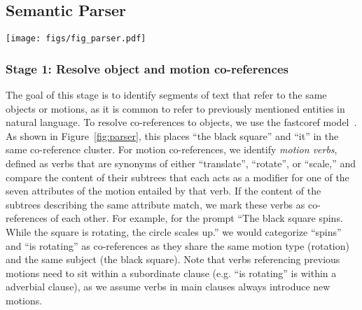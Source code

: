 \subsection{Semantic Parser}
\begin{figure*}[t]
    \centering
    \texttt{[image: figs/fig\_parser.pdf]}
    \caption{
        The processing pipeline of our semantic parser. 
    }
    \label{fig:parser}
\end{figure*}



\subsubsection{Stage 1: Resolve object and motion co-references}
The goal of this stage is to identify segments of text that refer to the same objects or motions, as it is common to refer to previously mentioned entities in natural language.
%
To resolve co-references to objects, we use the fastcoref model~\cite{otmazgin2022fastcoref}.
As shown in Figure~\ref{fig:parser}, this places ``the black square'' and ``it'' in the same co-reference cluster.
%
For motion co-references, we identify \textit{motion verbs}, defined as verbs that are synonyms of either ``translate'', ``rotate'', or ``scale,'' and compare the content of their subtrees that each acts as a modifier for one of the seven attributes of the motion entailed by that verb.
If the content of the subtrees describing the same attribute match, we mark these verbs as co-references of each other.
For example, for the prompt ``The black square spins. While the square is rotating, the circle scales up.'' we would categorize ``spins'' and ``is rotating'' as co-references as they share the same motion type (rotation) and the same subject (the black square).
Note that verbs referencing previous motions need to sit within a subordinate clause (e.g. ``is rotating'' is within a adverbial clause), as we assume verbs in main clauses always introduce new motions.


